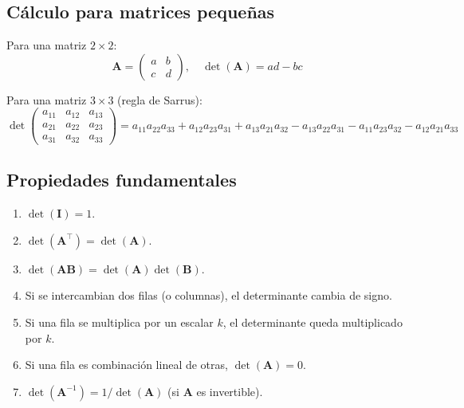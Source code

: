 \documentclass[12pt,a4paper,openany,oneside]{book}
\begin{document}
\begin{center}
\end{center}

\subsection{Cálculo para matrices pequeñas}
Para una matriz $2\times 2$:
\[
\mathbf{A} = \begin{pmatrix} a & b \\ c & d \end{pmatrix}, \quad \det(\mathbf{A}) = ad - bc
\]

Para una matriz $3\times 3$ (regla de Sarrus):
\[
\det\begin{pmatrix}
a_{11} & a_{12} & a_{13} \\
a_{21} & a_{22} & a_{23} \\
a_{31} & a_{32} & a_{33}
\end{pmatrix}
= a_{11}a_{22}a_{33} + a_{12}a_{23}a_{31} + a_{13}a_{21}a_{32}
- a_{13}a_{22}a_{31} - a_{11}a_{23}a_{32} - a_{12}a_{21}a_{33}
\]

\subsection{Propiedades fundamentales}
\begin{enumerate}
    \item $\det(\mathbf{I}) = 1$.
    \item $\det(\mathbf{A}^\top) = \det(\mathbf{A})$.
    \item $\det(\mathbf{A}\mathbf{B}) = \det(\mathbf{A})\det(\mathbf{B})$.
    \item Si se intercambian dos filas (o columnas), el determinante cambia de signo.
    \item Si una fila se multiplica por un escalar $k$, el determinante queda multiplicado por $k$.
    \item Si una fila es combinación lineal de otras, $\det(\mathbf{A}) = 0$.
    \item $\det(\mathbf{A}^{-1}) = 1/\det(\mathbf{A})$ (si $\mathbf{A}$ es invertible).
\end{enumerate}
\end{document}
